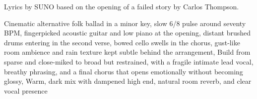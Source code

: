 
\begin{notes}
Lyrics by SUNO based on the opening of a failed story by Carlos Thompson.
\end{notes}
\begin{style}
Cinematic alternative folk ballad in a minor key, slow 6/8 pulse around  seventy BPM, fingerpicked acoustic guitar and low piano at the opening, distant brushed drums entering in the second verse, bowed cello swells in the chorus, gust-like room ambience and rain texture kept subtle behind the arrangement, Build from sparse and close-miked to broad but restrained, with a fragile intimate lead vocal, breathy phrasing, and a final chorus that opens emotionally without becoming glossy, Warm, dark mix with dampened high end, natural room reverb, and clear vocal presence
\end{style}
